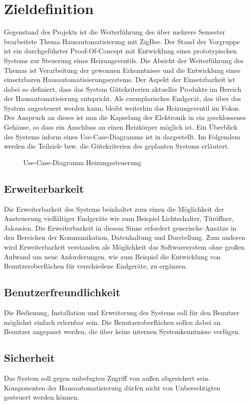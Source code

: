 \section{Zieldefinition}\label{Zieldefinition}
Gegenstand des Projekts ist die Weiterführung des über mehrere Semester bearbeitete Thema Hausautomatisierung mit ZigBee. Der Stand der Vorgruppe ist ein durchgeführter Proof-Of-Concept mit Entwicklung eines prototypischen Systems zur Steuerung eines Heizungsventils. Die Absicht der Weiterführung des Themas ist Verarbeitung der gewonnen Erkenntnisse und die Entwicklung eines einsetzbaren Hausautomatisierungssystems. Der Aspekt der Einsetzbarkeit ist dabei so definiert, dass das System Gütekriterien aktueller Produkte im Bereich der Hausautomatisierung entspricht. Als exemplarisches Endgerät, das über das System angesteuert werden kann, bleibt weiterhin das Heizungsventil im Fokus. Der Anspruch an dieses ist nun die Kapselung der Elektronik in ein geschlossenes Gehäuse, so dass ein Anschluss an einen Heizkörper möglich ist. Ein Überblick des Systems inform eines Use-Case-Diagramms ist in  dargestellt. Im Folgendem werden die Teilziele bzw. die Gütekriterien des geplanten Systems erläutert.

\begin{figure}[htb]
\centering
{}
\caption{Use-Case-Diagramm Heizungssteuerung}
\label{fig:UC}
\end{figure}

\subsection{Erweiterbarkeit}\label{Ziel_Erw}
Die Erweiterbarkeit des Systems beinhaltet zum einen die Möglichkeit der Ansteuerung vielfältiger Endgeräte wie zum Beispiel Lichtschalter, Türöffner, Jalousien. Die Erweiterbarkeit in diesem Sinne erfordert generische Ansätze in den Bereichen der Kommunikation, Datenhaltung und Darstellung. Zum anderen wird Erweiterbarkeit verstanden als Möglichkeit das Softwaresystem ohne großen Aufwand um neue Anforderungen, wie zum Beispiel die Entwicklung von Benutzeroberflächen für verschiedene Endgeräte, zu ergänzen.
\subsection{Benutzerfreundlichkeit}\label{Ziel_Ben}
Die Bedienung, Installation und Erweiterung des Systems soll für den Benutzer möglichst einfach erlernbar sein. Die Benutzeroberflächen sollen dabei an Benutzer angepasst werden, die über keine internen Systemkenntnisse verfügen.
\subsection{Sicherheit}\label{Ziel_Sic}
Das System soll gegen unbefugten Zugriff von außen abgesichert sein. Komponenten der Hausautomatisierung dürfen nicht von Unberechtigten gesteuert werden können.


